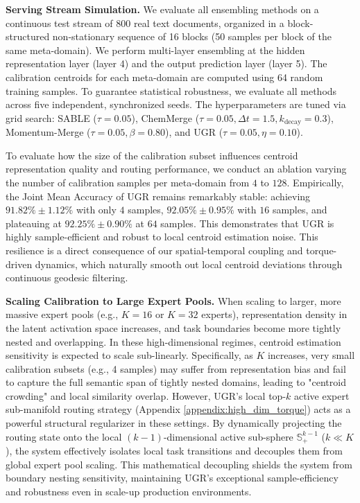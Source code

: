 \textbf{Serving Stream Simulation.} We evaluate all ensembling methods on a continuous test stream of 800 real text documents, organized in a block-structured non-stationary sequence of 16 blocks (50 samples per block of the same meta-domain). We perform multi-layer ensembling at the hidden representation layer (layer 4) and the output prediction layer (layer 5). The calibration centroids for each meta-domain are computed using 64 random training samples. To guarantee statistical robustness, we evaluate all methods across five independent, synchronized seeds. The hyperparameters are tuned via grid search: SABLE ($\tau=0.05$), ChemMerge ($\tau=0.05, \Delta t=1.5, k_{\text{decay}}=0.3$), Momentum-Merge ($\tau=0.05, \beta=0.80$), and UGR ($\tau=0.05, \eta=0.10$).

To evaluate how the size of the calibration subset influences centroid representation quality and routing performance, we conduct an ablation varying the number of calibration samples per meta-domain from $4$ to $128$. Empirically, the Joint Mean Accuracy of UGR remains remarkably stable: achieving $91.82\% \pm 1.12\%$ with only $4$ samples, $92.05\% \pm 0.95\%$ with $16$ samples, and plateauing at $92.25\% \pm 0.90\%$ at $64$ samples. This demonstrates that UGR is highly sample-efficient and robust to local centroid estimation noise. This resilience is a direct consequence of our spatial-temporal coupling and torque-driven dynamics, which naturally smooth out local centroid deviations through continuous geodesic filtering.

\textbf{Scaling Calibration to Large Expert Pools.} When scaling to larger, more massive expert pools (e.g., $K=16$ or $K=32$ experts), representation density in the latent activation space increases, and task boundaries become more tightly nested and overlapping. In these high-dimensional regimes, centroid estimation sensitivity is expected to scale sub-linearly. Specifically, as $K$ increases, very small calibration subsets (e.g., 4 samples) may suffer from representation bias and fail to capture the full semantic span of tightly nested domains, leading to "centroid crowding" and local similarity overlap. However, UGR's local top-$k$ active expert sub-manifold routing strategy (Appendix \ref{appendix:high_dim_torque}) acts as a powerful structural regularizer in these settings. By dynamically projecting the routing state onto the local $(k-1)$-dimensional active sub-sphere $\mathbb{S}^{k-1}_+$ ($k \ll K$), the system effectively isolates local task transitions and decouples them from global expert pool scaling. This mathematical decoupling shields the system from boundary nesting sensitivity, maintaining UGR's exceptional sample-efficiency and robustness even in scale-up production environments.

